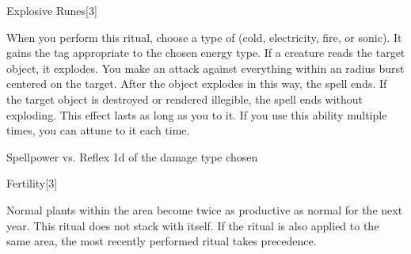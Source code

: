 \begin{spellsection}{Explosive Runes}[3]
\begin{spellcontent}
\begin{spelltargetinginfo}
\end{spelltargetinginfo}
\begin{spelleffects}
\spellspecial
When you perform this ritual, choose a type of  (cold, electricity, fire, or sonic).
It gains the tag appropriate to the chosen energy type.
\spelleffect
If a creature reads the target object, it explodes.
You make an attack against everything within an \areamed radius burst centered on the target.
After the object explodes in this way, the spell ends.
If the target object is destroyed or rendered illegible, the spell ends without exploding.
This effect lasts as long as you  to it.
If you use this ability multiple times, you can attune to it each time.
\begin{spellattack}{Spellpower vs. Reflex}
\spellsuccess {} \minus1d of the damage type chosen
\end{spellattack}
\end{spelleffects}
\end{spellcontent}
\begin{spellfooter}
\end{spellfooter}
\begin{spellsubcontent}
\end{spellsubcontent}
\end{spellsection}
\begin{spellsection}{Fertility}[3]
\begin{spellcontent}
\begin{spelltargetinginfo}
\end{spelltargetinginfo}
\begin{spelleffects}
\spelleffect
Normal plants within the area become twice as productive as normal for the next year.
This ritual does not stack with itself.
If the  ritual is also applied to the same area, the most recently performed ritual takes precedence.
\end{spelleffects}
\end{spellcontent}
\begin{spellfooter}
\end{spellfooter}
\begin{spellsubcontent}
\end{spellsubcontent}
\end{spellsection}
